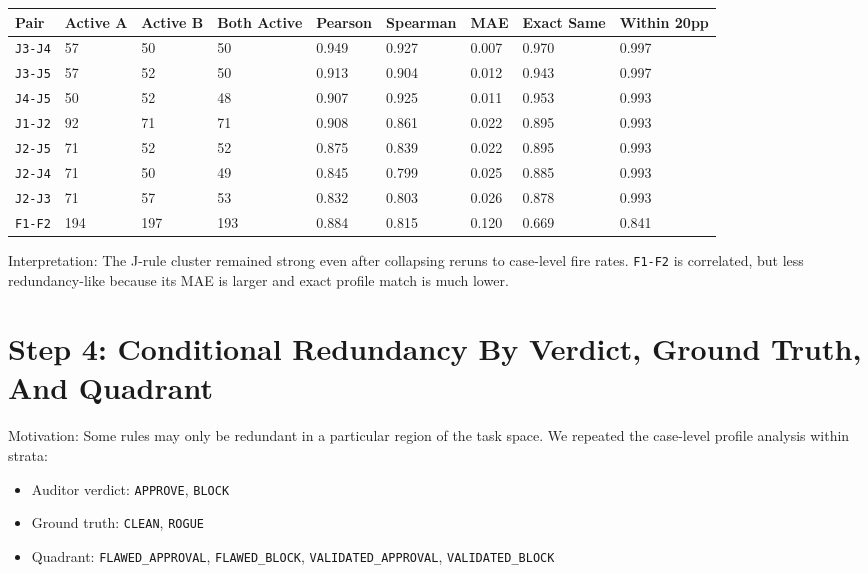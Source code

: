 \documentclass[11pt]{article}
\begin{document}
\begingroup
\small
\begin{longtable}{L{0.12\textwidth} R{0.08\textwidth} R{0.08\textwidth} R{0.09\textwidth} R{0.08\textwidth} R{0.08\textwidth} R{0.08\textwidth} R{0.09\textwidth} R{0.09\textwidth}}
\toprule
Pair & Active A & Active B & Both Active & Pearson & Spearman & MAE & Exact Same & Within 20pp \\
\midrule
\endhead
\texttt{J3-J4} & 57 & 50 & 50 & 0.949 & 0.927 & 0.007 & 0.970 & 0.997 \\
\texttt{J3-J5} & 57 & 52 & 50 & 0.913 & 0.904 & 0.012 & 0.943 & 0.997 \\
\texttt{J4-J5} & 50 & 52 & 48 & 0.907 & 0.925 & 0.011 & 0.953 & 0.993 \\
\texttt{J1-J2} & 92 & 71 & 71 & 0.908 & 0.861 & 0.022 & 0.895 & 0.993 \\
\texttt{J2-J5} & 71 & 52 & 52 & 0.875 & 0.839 & 0.022 & 0.895 & 0.993 \\
\texttt{J2-J4} & 71 & 50 & 49 & 0.845 & 0.799 & 0.025 & 0.885 & 0.993 \\
\texttt{J2-J3} & 71 & 57 & 53 & 0.832 & 0.803 & 0.026 & 0.878 & 0.993 \\
\texttt{F1-F2} & 194 & 197 & 193 & 0.884 & 0.815 & 0.120 & 0.669 & 0.841 \\
\bottomrule
\end{longtable}
\endgroup

Interpretation: The J-rule cluster remained strong even after collapsing reruns to case-level fire rates. \texttt{F1-F2} is correlated, but less redundancy-like because its MAE is larger and exact profile match is much lower.

\section*{Step 4: Conditional Redundancy By Verdict, Ground Truth, And Quadrant}

Motivation: Some rules may only be redundant in a particular region of the task space. We repeated the case-level profile analysis within strata:

\begin{itemize}[leftmargin=1.5em]
  \item Auditor verdict: \texttt{APPROVE}, \texttt{BLOCK}
  \item Ground truth: \texttt{CLEAN}, \texttt{ROGUE}
  \item Quadrant: \texttt{FLAWED\_APPROVAL}, \texttt{FLAWED\_BLOCK}, \texttt{VALIDATED\_APPROVAL}, \texttt{VALIDATED\_BLOCK}
\end{itemize}
\end{document}
